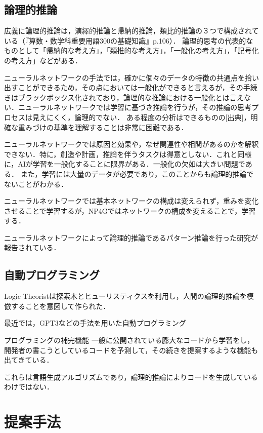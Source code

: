 \documentclass[exploratorypaper]{jsaiart} %
\begin{document}
\subsection{論理的推論}
広義に論理的推論は，演繹的推論と帰納的推論，類比的推論の３つで構成されている（『算数・数学科重要用語300の基礎知識』p.106）．
論理的思考の代表的なものとして「帰納的な考え方」，「類推的な考え方」，「一般化の考え方」，「記号化の考え方」などがある\cite{saito:11}．

ニューラルネットワークの手法では，確かに個々のデータの特徴の共通点を拾い出すことができるため，その点においては一般化ができると言えるが，その手続きはブラックボックス化されており，論理的な推論における一般化とは言えない．ニューラルネットワークでは学習に基づき推論を行うが，その推論の思考プロセスは見えにくく，論理的でない．
ある程度の分析はできるものの[出典]，明確な重みづけの基準を理解することは非常に困難である．

ニューラルネットワークでは原因と効果や，なぜ関連性や相関があるのかを解釈できない．特に，創造や計画，推論を伴うタスクは得意としない．これと同様に，AIが学習を一般化することに限界がある．一般化の欠如は大きい問題である．
また，学習には大量のデータが必要であり，このことからも論理的推論でないことがわかる．

ニューラルネットワークでは基本ネットワークの構成は変えられず，重みを変化させることで学習するが，NP4Gではネットワークの構成を変えることで，学習する．

ニューラルネットワークによって論理的推論であるパターン推論を行った研究が報告されている\cite{tsukimoto:00}\cite{sudo:07}．


\subsection{自動プログラミング}
Logic Theorist\cite{LogicTheorist}は探索木とヒューリスティクスを利用し，人間の論理的推論を模倣することを意図して作られた．

最近では，GPT3\cite{gpt3}などの手法を用いた自動プログラミング

プログラミングの補完機能
一般に公開されている膨大なコードから学習をし，開発者の書こうとしているコードを予測して，その続きを提案するような機能も出てきている\cite{copilot}．

これらは言語生成アルゴリズムであり，論理的推論によりコードを生成しているわけではない．

\section{提案手法}
\end{document}
